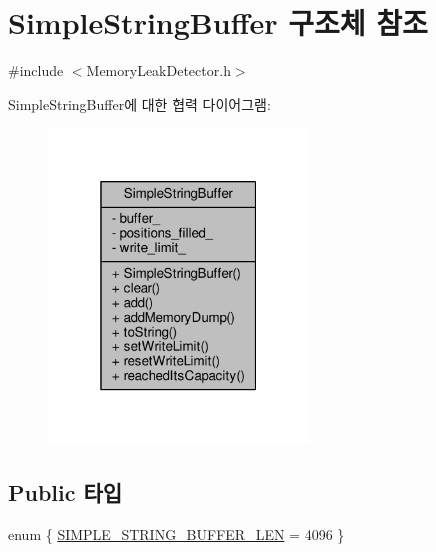 \hypertarget{struct_simple_string_buffer}{}\section{Simple\+String\+Buffer 구조체 참조}
\label{struct_simple_string_buffer}


{\ttfamily \#include $<$Memory\+Leak\+Detector.\+h$>$}



Simple\+String\+Buffer에 대한 협력 다이어그램\+:
\nopagebreak
\begin{figure}[H]
\begin{center}
\leavevmode
\includegraphics[width=196pt]{struct_simple_string_buffer__coll__graph}
\end{center}
\end{figure}
\subsection*{Public 타입}
\begin{DoxyCompactItemize}
\item 
enum \{ \hyperlink{struct_simple_string_buffer_a4efaf4e07364d6302f598569aa7e55dca495824058d0344ce7789bfdfe6658843}{S\+I\+M\+P\+L\+E\+\_\+\+S\+T\+R\+I\+N\+G\+\_\+\+B\+U\+F\+F\+E\+R\+\_\+\+L\+EN} = 4096
 \}
\end{DoxyCompactItemize}
